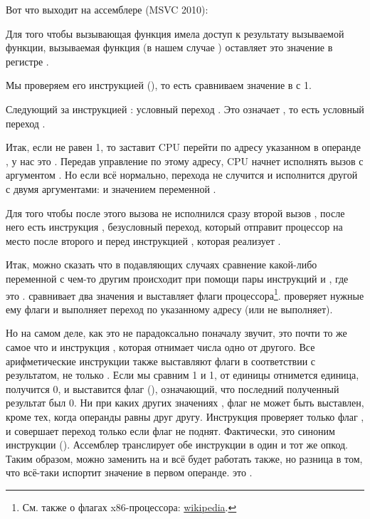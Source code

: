 
Вот что выходит на ассемблере (MSVC 2010):



Для того чтобы вызывающая функция имела доступ к результату вызываемой функции, 
вызываемая функция (в нашем случае \scanf) оставляет это значение в регистре \EAX.

Мы проверяем его инструкцией  (), то есть сравниваем значение в \EAX с 1.

Следующий за инструкцией \CMP: условный переход \JNE. Это означает , то есть условный переход .

Итак, если \EAX не равен 1, то \JNE заставит \ac{CPU} перейти по адресу указанном в операнде \JNE, у нас это .
Передав управление по этому адресу, \ac{CPU} начнет исполнять вызов \printf с аргументом .
Но если всё нормально, перехода не случится и исполнится другой \printf с двумя аргументами:  и значением переменной .

Для того чтобы после этого вызова не исполнился сразу второй вызов \printf, 
после него есть инструкция \JMP, безусловный переход, который отправит процессор на место 
после второго \printf и перед инструкцией , которая реализует .

Итак, можно сказать что в подавляющих случаях сравнение какой-либо переменной с чем-то другим происходит при помощи пары инструкций \CMP и \Jcc, где  это .
\CMP сравнивает два значения и выставляет  флаги процессора\footnote{См. также о флагах x86-процессора: \href{http://go.yurichev.com/17120}{wikipedia}.}.
\Jcc проверяет нужные ему флаги и выполняет переход по указанному адресу (или не выполняет).

\label{CMPandSUB}
Но на самом деле, как это не парадоксально поначалу звучит, \CMP это почти то же самое что и инструкция \SUB, которая отнимает числа одно от другого.
Все арифметические инструкции также выставляют флаги в соответствии с результатом, не только \CMP.
Если мы сравним 1 и 1, от единицы отнимется единица, получится 0, и выставится флаг \ZF (), означающий, что последний полученный результат был 0.
Ни при каких других значениях \EAX, флаг \ZF не может быть выставлен, кроме тех, когда операнды равны друг другу.
Инструкция \JNE проверяет только флаг \ZF, и совершает переход только если флаг не поднят. Фактически, \JNE это синоним инструкции \JNZ ().
Ассемблер транслирует обе инструкции в один и тот же опкод.
Таким образом, можно \CMP заменить на \SUB и всё будет работать также, но разница в том, что \SUB всё-таки испортит значение в первом операнде.
\CMP это .

